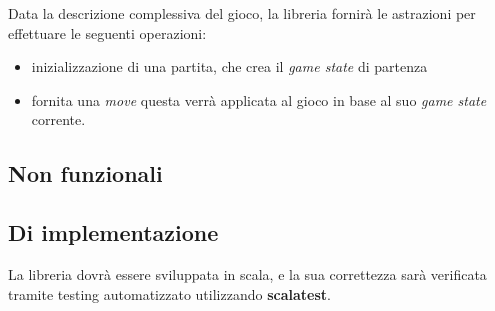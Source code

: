 Data la descrizione complessiva del gioco, la libreria fornirà le astrazioni per effettuare le seguenti operazioni:

\begin{itemize}
    \item inizializzazione di una partita, che crea il \textit{game state} di partenza
    \item fornita una \textit{move} questa verrà applicata al gioco in base al suo \textit{game state} corrente.
\end{itemize}

\subsection{Non funzionali}



\subsection{Di implementazione}

La libreria dovrà essere sviluppata in scala, e la sua correttezza sarà verificata tramite testing automatizzato utilizzando \textbf{scalatest}.